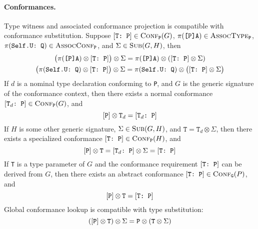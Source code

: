 \documentclass[../generics]{subfiles}
\begin{document}
\paragraph{Conformances.} Type witness and associated conformance projection is compatible with conformance substitution. Suppose $[\texttt{T:~P}]\in\textsc{Conf}_{\texttt{P}}({G})$, $\pi(\texttt{[P]A})\in\textsc{AssocType}_{\texttt{P}}$, $\pi(\texttt{Self.U:~Q})\in\textsc{AssocConf}_{\texttt{P}}$, and $\Sigma\in\textsc{Sub}({G, H})$, then
\begin{gather*}
\bigl(\pi(\texttt{[P]A})\otimes [\texttt{T:~P}]\bigr)\otimes \Sigma=\pi(\texttt{[P]A})\otimes ([\texttt{T:~P}]\otimes \Sigma)\\
\bigl(\pi(\texttt{Self.U:~Q})\otimes [\texttt{T:~P}]\bigr)\otimes \Sigma=\pi(\texttt{Self.U:~Q})\otimes \bigl([\texttt{T:~P}]\otimes \Sigma\bigr)
\end{gather*}
If $d$ is a nominal type declaration conforming to \texttt{P}, and $G$ is the generic signature of the conformance context, then there exists a normal conformance $[\texttt{$\texttt{T}_d$:~P}]\in\textsc{Conf}_{\texttt{P}}({G})$, and
\[[\texttt{P}]\otimes\texttt{T}_d=[\texttt{$\texttt{T}_d$:~P}]\]
If $H$ is some other generic signature, $\Sigma\in\textsc{Sub}({G, H})$, and $\texttt{T}=\texttt{T}_d\otimes \Sigma$, then there exists a specialized conformance $[\texttt{T:~P}]\in\textsc{Conf}_{\texttt{P}}({H})$, and
\[[\texttt{P}]\otimes\texttt{T}=[\texttt{$\texttt{T}_d$:~P}]\otimes \Sigma = [\texttt{T:~P}]\]
If \texttt{T} is a type parameter of $G$ and the conformance requirement $[\texttt{T:~P}]$ can be derived from $G$, then there exists an abstract conformance $[\texttt{T:~P}]\in\textsc{Conf}_{\texttt{G}}({P})$, and
\[[\texttt{P}]\otimes\texttt{T} = [\texttt{T:~P}]\]
Global conformance lookup is compatible with type substitution:
\[([\texttt{P}]\otimes\texttt{T})\otimes \Sigma = \texttt{P}\otimes(\texttt{T}\otimes \Sigma)\]
\end{document}
